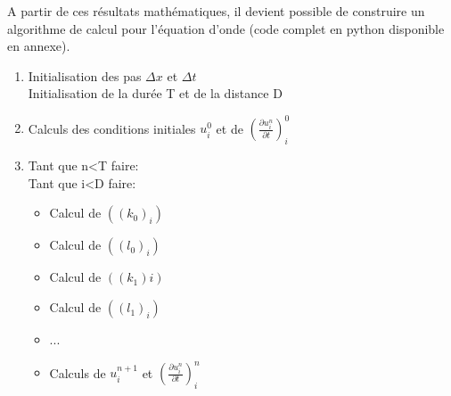 A partir de ces résultats mathématiques, il devient possible de construire un algorithme de calcul pour l'équation d'onde (code complet en python disponible en annexe).

\begin{enumerate}
    \item Initialisation des pas $\Delta x$ et $\Delta t$\\
    Initialisation de la durée T et de la distance D
    
    \item Calculs des conditions initiales $u^0_{i}$ et de $(\frac{\partial u^n_{i}}{\partial t})^0_{i}$
    
    \item Tant que n<T faire:\\
     Tant que i<D faire:
        \begin{itemize}
            \item Calcul de $((k_0)_{i})$
            \item Calcul de $((l_0)_{i})$
            \item Calcul de $((k_1){i})$
            \item Calcul de $((l_1)_{i})$
            \item ...
            \item Calculs de $u^{n+1}_{i}$ et $(\frac{\partial u^n_{i}}{\partial t})^n_{i}$
        \end{itemize}
    
\end{enumerate}

